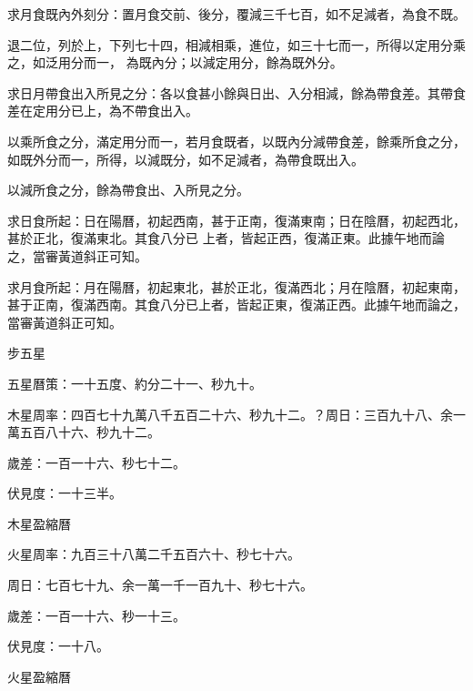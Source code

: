 \begin{pinyinscope}
 求月食既內外刻分：置月食交前、後分，覆減三千七百，如不足減者，為食不既。



 退二位，列於上，下列七十四，相減相乘，進位，如三十七而一，所得以定用分乘之，如泛用分而一，
 為既內分；以減定用分，餘為既外分。



 求日月帶食出入所見之分：各以食甚小餘與日出、入分相減，餘為帶食差。其帶食差在定用分已上，為不帶食出入。



 以乘所食之分，滿定用分而一，若月食既者，以既內分減帶食差，餘乘所食之分，如既外分而一，所得，以減既分，如不足減者，為帶食既出入。



 以減所食之分，餘為帶食出、入所見之分。



 求日食所起：日在陽曆，初起西南，甚于正南，復滿東南；日在陰曆，初起西北，甚於正北，復滿東北。其食八分已
 上者，皆起正西，復滿正東。此據午地而論之，當審黃道斜正可知。



 求月食所起：月在陽曆，初起東北，甚於正北，復滿西北；月在陰曆，初起東南，甚于正南，復滿西南。其食八分已上者，皆起正東，復滿正西。此據午地而論之，當審黃道斜正可知。



 步五星



 五星曆策：一十五度、約分二十一、秒九十。



 木星周率：四百七十九萬八千五百二十六、秒九十二。？周日：三百九十八、余一萬五百八十六、秒九十二。



 歲差：一百一十六、秒七十二。



 伏見度：一十三半。



 木星盈縮曆



 火星周率：九百三十八萬二千五百六十、秒七十六。



 周日：七百七十九、余一萬一千一百九十、秒七十六。



 歲差：一百一十六、秒一十三。



 伏見度：一十八。



 火星盈縮曆




\end{pinyinscope}
